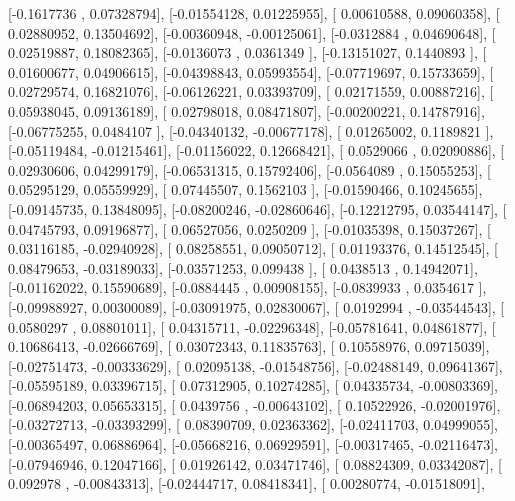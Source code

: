 \documentclass{article}
\begin{document}
       [-0.1617736 ,  0.07328794],
       [-0.01554128,  0.01225955],
       [ 0.00610588,  0.09060358],
       [ 0.02880952,  0.13504692],
       [-0.00360948, -0.00125061],
       [-0.0312884 ,  0.04690648],
       [ 0.02519887,  0.18082365],
       [-0.0136073 ,  0.0361349 ],
       [-0.13151027,  0.1440893 ],
       [ 0.01600677,  0.04906615],
       [-0.04398843,  0.05993554],
       [-0.07719697,  0.15733659],
       [ 0.02729574,  0.16821076],
       [-0.06126221,  0.03393709],
       [ 0.02171559,  0.00887216],
       [ 0.05938045,  0.09136189],
       [ 0.02798018,  0.08471807],
       [-0.00200221,  0.14787916],
       [-0.06775255,  0.0484107 ],
       [-0.04340132, -0.00677178],
       [ 0.01265002,  0.1189821 ],
       [-0.05119484, -0.01215461],
       [-0.01156022,  0.12668421],
       [ 0.0529066 ,  0.02090886],
       [ 0.02930606,  0.04299179],
       [-0.06531315,  0.15792406],
       [-0.0564089 ,  0.15055253],
       [ 0.05295129,  0.05559929],
       [ 0.07445507,  0.1562103 ],
       [-0.01590466,  0.10245655],
       [-0.09145735,  0.13848095],
       [-0.08200246, -0.02860646],
       [-0.12212795,  0.03544147],
       [ 0.04745793,  0.09196877],
       [ 0.06527056,  0.0250209 ],
       [-0.01035398,  0.15037267],
       [ 0.03116185, -0.02940928],
       [ 0.08258551,  0.09050712],
       [ 0.01193376,  0.14512545],
       [ 0.08479653, -0.03189033],
       [-0.03571253,  0.099438  ],
       [ 0.0438513 ,  0.14942071],
       [-0.01162022,  0.15590689],
       [-0.0884445 ,  0.00908155],
       [-0.0839933 ,  0.0354617 ],
       [-0.09988927,  0.00300089],
       [-0.03091975,  0.02830067],
       [ 0.0192994 , -0.03544543],
       [ 0.0580297 ,  0.08801011],
       [ 0.04315711, -0.02296348],
       [-0.05781641,  0.04861877],
       [ 0.10686413, -0.02666769],
       [ 0.03072343,  0.11835763],
       [ 0.10558976,  0.09715039],
       [-0.02751473, -0.00333629],
       [ 0.02095138, -0.01548756],
       [-0.02488149,  0.09641367],
       [-0.05595189,  0.03396715],
       [ 0.07312905,  0.10274285],
       [ 0.04335734, -0.00803369],
       [-0.06894203,  0.05653315],
       [ 0.0439756 , -0.00643102],
       [ 0.10522926, -0.02001976],
       [-0.03272713, -0.03393299],
       [ 0.08390709,  0.02363362],
       [-0.02411703,  0.04999055],
       [-0.00365497,  0.06886964],
       [-0.05668216,  0.06929591],
       [-0.00317465, -0.02116473],
       [-0.07946946,  0.12047166],
       [ 0.01926142,  0.03471746],
       [ 0.08824309,  0.03342087],
       [ 0.092978  , -0.00843313],
       [-0.02444717,  0.08418341],
       [ 0.00280774, -0.01518091],
\end{document}
